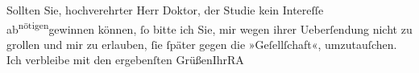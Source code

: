 \pstart
           Sollten Sie, hochverehrter Herr Doktor, der Studie kein Intereſſe ab\substVorne{}\textsuperscript{nötigen}\substDazwischen{}gewinnen\substHinten{} können, ſo bitte ich Sie, mir wegen ihrer Ueberſendung nicht zu grollen und
               mir zu erlauben, ſie \introOben{}ſpäter\introOben{} gegen die »Geſellſchaft«,  umzutauſchen.\pend
           \pstart Ich verbleibe mit den ergebenſten Grüßen\hspace*{1.5em}Ihr\hspace*{1.5em}\spacefill\mbox{RA}\pend{}\endnumbering{}  
      